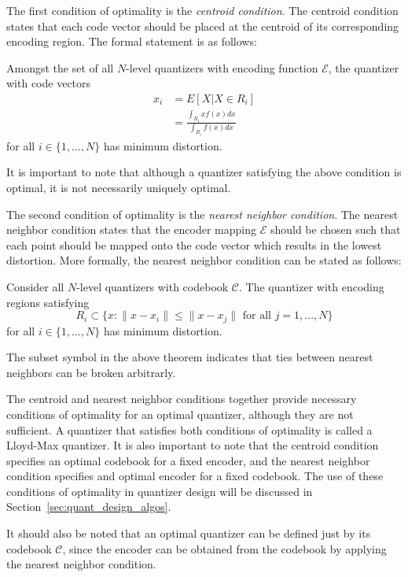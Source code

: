 The first condition of optimality is the \emph{centroid condition}. The centroid condition states that each code vector should be placed at the centroid of its corresponding encoding region. The formal statement is as follows:
\begin{theorem}
\label{theo:cent_vq}
Amongst the set of all $N$-level quantizers with encoding function $\mathcal{E}$, the quantizer with code vectors
\begin{align}
  \label{eq:cent_vq}
x_i &= E[X | X \in R_i] \\
&= \frac{ \int_{R_i}xf(x)dx }{ \int_{R_i}f(x)dx }
\end{align}
for all $i \in \{1,\ldots,N\}$ has minimum distortion.
\end{theorem}
It is important to note that although a quantizer satisfying the above condition is optimal, it is not necessarily uniquely optimal.

The second condition of optimality is the \emph{nearest neighbor condition}. The nearest neighbor condition states that the encoder mapping $\mathcal{E}$ should be chosen such that each point should be mapped onto the code vector which results in the lowest distortion. More formally, the nearest neighbor condition can be stated as follows:
\begin{theorem}
Consider all $N$-level quantizers with codebook $\mathcal{C}$. The quantizer with encoding regions satisfying
\begin{equation}
R_i \subset \{x : \| x - x_i \| \le \| x - x_j \| \text{ for all } j = 1,\ldots,N \}
\end{equation}
for all $i \in \{1,\ldots,N\}$ has minimum distortion.
\end{theorem}
The subset symbol in the above theorem indicates that ties between nearest neighbors can be broken arbitrarly.

The centroid and nearest neighbor conditions together provide necessary conditions of optimality for an optimal quantizer, although they are not sufficient. A quantizer that satisfies both conditions of optimality is called a Lloyd-Max quantizer. It is also important to note that the centroid condition specifies an optimal codebook for a fixed encoder, and the nearest neighbor condition specifies and optimal encoder for a fixed codebook. The use of these conditions of optimality in quantizer design will be discussed in Section~\ref{sec:quant_design_algos}.

It should also be noted that an optimal quantizer can be defined just by its codebook $\mathcal{C}$, since the encoder can be obtained from the codebook by applying the nearest neighbor condition.

